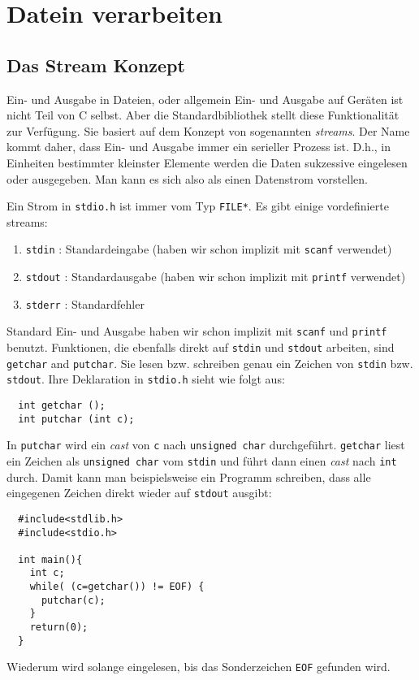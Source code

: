 \section{Datein verarbeiten}


\subsection{Das Stream Konzept}

Ein- und Ausgabe in Dateien, oder allgemein Ein- und Ausgabe auf Geräten ist nicht Teil von C selbst.
Aber die Standardbibliothek stellt diese Funktionalität zur Verfügung.
Sie basiert auf dem Konzept von sogenannten \emph{streams}.
Der Name kommt daher, dass Ein- und Ausgabe immer ein serieller Prozess ist.
D.h., in Einheiten bestimmter kleinster Elemente werden die Daten sukzessive eingelesen oder ausgegeben.
Man kann es sich also als einen Datenstrom vorstellen.

Ein Strom in \verb|stdio.h| ist immer vom Typ \verb|FILE*|.
Es gibt einige vordefinierte streams:
\begin{enumerate}
\item \verb|stdin| : Standardeingabe (haben wir schon implizit mit \texttt{scanf} verwendet) 
\item \texttt{stdout} : Standardausgabe (haben wir schon implizit mit \texttt{printf} verwendet) 
\item \texttt{stderr} : Standardfehler
\end{enumerate} 
Standard Ein- und Ausgabe haben wir schon implizit mit \texttt{scanf} und \texttt{printf} benutzt.
Funktionen, die ebenfalls direkt auf \verb|stdin| und \texttt{stdout} arbeiten, sind \verb|getchar| and \verb|putchar|.
Sie lesen bzw. schreiben genau ein Zeichen von \verb|stdin| bzw. \texttt{stdout}.
Ihre Deklaration in \verb|stdio.h| sieht wie folgt aus:
\begin{lstlisting}
  int getchar ();
  int putchar (int c);
\end{lstlisting}
In \verb|putchar| wird ein \emph{cast} von \verb|c| nach \verb|unsigned char| durchgeführt.
\verb|getchar| liest ein Zeichen als \verb|unsigned char| vom \verb|stdin| und führt dann einen \emph{cast} nach \verb|int| durch.
Damit kann man beispielsweise ein Programm schreiben, dass alle eingegenen Zeichen direkt wieder auf \texttt{stdout} ausgibt:
\begin{lstlisting}
  #include<stdlib.h>
  #include<stdio.h>
  
  int main(){
    int c;
    while( (c=getchar()) != EOF) {
      putchar(c);
    }
    return(0);
  }
\end{lstlisting}
Wiederum wird solange eingelesen, bis das Sonderzeichen \verb|EOF| gefunden wird.

